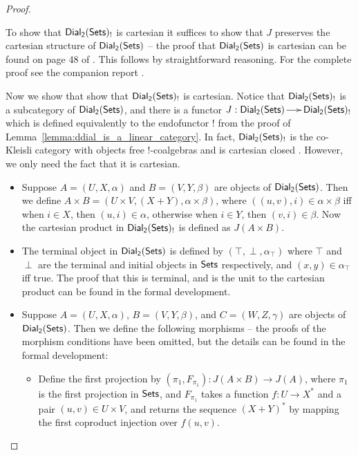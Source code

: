 \begin{proof}
\begin{paper}
    To show that $\mathsf{Dial_2}(\mathsf{Sets})_!$ is cartesian it suffices to show that $J$
    preserves the cartesian structure of $\mathsf{Dial_2}(\mathsf{Sets})$ -- the proof that
    $\mathsf{Dial_2}(\mathsf{Sets})$ is cartesian can be found on page 48 of
    \cite{dePaiva:1988}.  This follows by straightforward reasoning.
    For the complete proof see the companion report \cite{Eades:2015}.
  \end{paper}
  \begin{report}
  Now we show that show that $\mathsf{Dial_2}(\mathsf{Sets})_!$ is cartesian.  Notice that
  $\mathsf{Dial_2}(\mathsf{Sets})_!$ is a subcategory of $\mathsf{Dial_2}(\mathsf{Sets})$, and there is a functor $J :
  \mathsf{Dial_2}(\mathsf{Sets}) \to \mathsf{Dial_2}(\mathsf{Sets})_!$ which is defined equivalently to the endofunctor
  $!$ from the proof of Lemma~\ref{lemma:ddial_is_a_linear_category}.
  In fact, $\mathsf{Dial_2}(\mathsf{Sets})_!$ is the co-Kleisli category with objects free
  !-coalgebras and is cartesian closed \cite{dePaiva:1987}.  However,
  we only need the fact that it is cartesian.
  \begin{itemize}
  \item Suppose $A = (U , X , \alpha)$ and $B = (V , Y , \beta)$ are
    objects of $\mathsf{Dial_2}(\mathsf{Sets})$. Then we define $A \times B = (U \times V, (X +
    Y), \alpha \times \beta)$, where $((u , v), i) \in \alpha \times
    \beta$ iff when $i \in X$, then $(u , i) \in \alpha$, otherwise
    when $i \in Y$, then $(v , i) \in \beta$.  Now the cartesian
    product in $\mathsf{Dial_2}(\mathsf{Sets})_!$ is defined as $J(A \times B)$.

  \item The terminal object in $\mathsf{Dial_2}(\mathsf{Sets})$ is defined by $(\top, \perp,
    \alpha_\top)$ where $\top$ and $\perp$ are the terminal and
    initial objects in $\mathsf{Sets}$ respectively, and $(x , y) \in
    \alpha_\top$ iff true. The proof that this is terminal, and is the
    unit to the cartesian product can be found in the formal
    development.
    
  \item Suppose $A = (U , X , \alpha)$, $B = (V , Y , \beta)$, and $C
    = (W , Z , \gamma)$ are objects of $\mathsf{Dial_2}(\mathsf{Sets})$.  Then we define
    the following morphisms -- the proofs of the morphism conditions
    have been omitted, but the details can be found in the formal
    development:
    \begin{itemize}
    \item Define the first projection by $(\pi_1, F_{\pi_1}) : J(A
      \times B) \to J(A)$, where $\pi_1$ is the first projection in
      $\mathsf{Sets}$, and $F_{\pi_1}$ takes a function $f : U \to X^*$ and a
      pair $(u , v) \in U \times V$, and returns the sequence $(X +
      Y)^*$ by mapping the first coproduct injection over $f(u ,v)$.


\end{itemize}
\end{itemize}
\end{report}
\end{proof}
